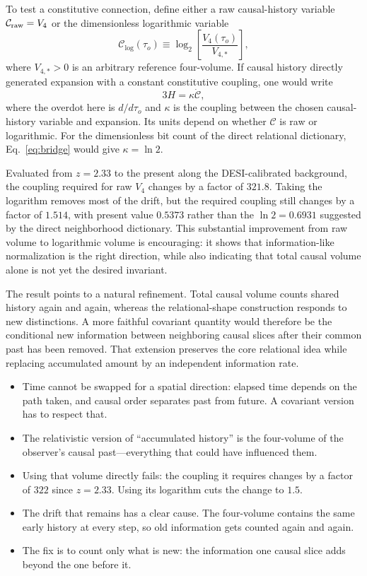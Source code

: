 \documentclass[10pt]{article}
\newenvironment{persuasions}
  {\begin{cpbox}\small\setlength{\parskip}{0pt}%
   {\footnotesize\bfseries\color{accent}%
    \textls[110]{CONCEPTUAL PERSUASIONS}}\par\vspace{3pt}%
   \begin{itemize}[leftmargin=1.15em,itemsep=2.5pt,topsep=0pt,parsep=0pt,
                   label=\textcolor{accent}{\scriptsize$\blacktriangleright$}]}
  {\end{itemize}\end{cpbox}}
\begin{document}
To test a constitutive connection, define either a raw causal-history variable
$\mathcal C_{\rm raw}=V_4$ or the dimensionless logarithmic variable
\begin{equation}
\mathcal C_{\log}(\tau_o)
\equiv\log_2\!\left[\frac{V_4(\tau_o)}{V_{4,*}}\right],
\label{eq:causal-complexity}
\end{equation}
where $V_{4,*}>0$ is an arbitrary reference four-volume.  If causal history
directly generated expansion with a constant constitutive coupling, one would
write
\begin{equation}
3H=\kappa\dot{\mathcal C},
\label{eq:constitutive-coupling}
\end{equation}
where the overdot here is $d/d\tau_o$ and $\kappa$ is the coupling between the
chosen causal-history variable and expansion.  Its units depend on whether
$\mathcal C$ is raw or logarithmic.  For the dimensionless bit count of the
direct relational dictionary, Eq.~\eqref{eq:bridge} would give
$\kappa=\ln2$.

Evaluated from $z=2.33$ to the present along the DESI-calibrated background,
the coupling required for raw $V_4$ changes by a factor of $321.8$.  Taking the
logarithm removes most of the drift, but the required coupling still changes by
a factor of $1.514$, with present value $0.5373$ rather than the $\ln2=0.6931$
suggested by the direct neighborhood dictionary.  This substantial
improvement from raw volume to logarithmic volume is encouraging: it shows
that information-like normalization is the right direction, while also
indicating that total causal volume alone is not yet the desired invariant.

The result points to a natural refinement.  Total causal volume counts shared
history again and again, whereas the relational-shape construction responds to
new distinctions.  A more faithful covariant quantity would therefore be the
conditional new information between neighboring causal slices after their
common past has been removed.  That extension preserves the core relational
idea while replacing accumulated amount by an independent information rate.

\begin{persuasions}
\item Time cannot be swapped for a spatial direction: elapsed time depends on
the path taken, and causal order separates past from future.  A covariant
version has to respect that.
\item The relativistic version of ``accumulated history'' is the four-volume of
the observer's causal past---everything that could have influenced them.
\item Using that volume directly fails: the coupling it requires changes by a
factor of $322$ since $z=2.33$.  Using its logarithm cuts the change to $1.5$.
\item The drift that remains has a clear cause.  The four-volume contains the
same early history at every step, so old information gets counted again and
again.
\item The fix is to count only what is new: the information one causal slice
adds beyond the one before it.
\end{persuasions}
\end{document}
